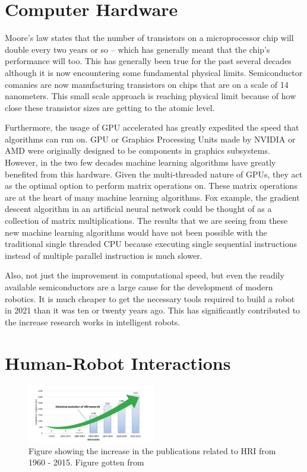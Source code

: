 \documentclass[conference]{IEEEtran}
\begin{document}
\section{Computer Hardware}
Moore’s law states that the number of transistors on a microprocessor chip will double every two years or so -- which has generally meant that the chip's performance will too\autocite{waldrop2016chips}. This has generally been true for the past several decades although  it is now encountering some fundamental physical limits. Semiconductor comanies are now manufacturing transistors on chips that are on a scale of 14 nanometers\autocite{pratt2015cambrian}. This small scale approach is reaching physical limit because of how close these transistor sizes are getting to the atomic level\autocite{waldrop2016chips}.

Furthermore, the usage of GPU accelerated has greatly expedited the speed that algorithms can run on. GPU or Graphics Processing Units made by NVIDIA or AMD were originally designed to be components in graphics subsystems. However, in the two few decades machine learning algorithms have greatly benefited from this hardware. Given the multi-threaded nature of GPUs, they act as the optimal option to perform matrix operations on\autocite{steinkraus2005using}. These matrix operations are at the heart of many machine learning algorithms. Fox example, the gradient descent algorithm in an artificial neural network could be thought of as a collection of matrix multiplications\autocite{krizhevsky2012imagenet}. The results that we are seeing from these new machine learning algorithms would have not been possible with the traditional single threaded CPU because executing single sequential instructions instead of multiple parallel instruction is much slower. 

Also, not just the improvement in computational speed, but even the readily available semiconductors are a large cause for the development of modern robotics. It is much cheaper to get the necessary tools required to build a robot in 2021 than it was ten or twenty years ago. This has significantly contributed to the increase research works in intelligent robots.

\section{Human-Robot Interactions}
\begin{figure}[h]
    \centerline{\includegraphics[width=0.5\textwidth]{images/evolution_of_hri.png}}
    \caption{Figure showing the increase in the publications related to HRI from 1960 - 2015. Figure gotten from\autocite{tsarouchi2016human}}
\label{fig1}
\end{figure}
\end{document}
